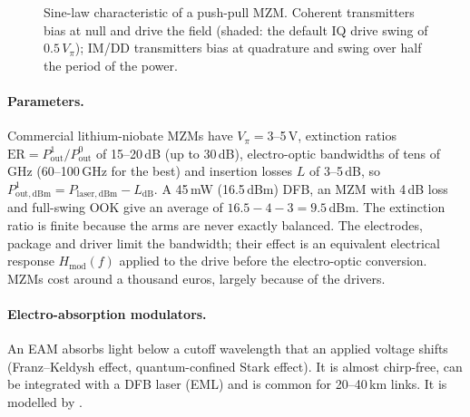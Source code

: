 \begin{figure}[htbp]
\centering
{}
\caption{Sine-law characteristic of a push-pull MZM. Coherent transmitters bias at null and
drive the field (shaded: the default IQ drive swing of $0.5\,V_\pi$); IM/DD transmitters bias at
quadrature and swing over half the period of the power.}
\label{fig:mzm}
\end{figure}

\paragraph{Parameters.} Commercial lithium-niobate MZMs have $V_\pi=3$--5\,V, extinction ratios
$\mathrm{ER}=P_{\mathrm{out}}^1/P_{\mathrm{out}}^0$ of 15--20\,dB (up to 30\,dB), electro-optic bandwidths of tens of GHz (60--100\,GHz
for the best) and insertion losses $L$ of 3--5\,dB, so $P_{\mathrm{out,dBm}}^1=P_{\mathrm{laser,dBm}}-L_{\mathrm{dB}}$. A 45\,mW
(16.5\,dBm) DFB, an MZM with 4\,dB loss and full-swing OOK give an average of
$16.5-4-3=9.5$\,dBm. The extinction ratio is finite because the arms are never exactly balanced.
The electrodes, package and driver limit the bandwidth; their effect is an equivalent
electrical response $H_{\mathrm{mod}}(f)$ applied to the drive before the electro-optic conversion. MZMs
cost around a thousand euros, largely because of the drivers.

\paragraph{Electro-absorption modulators.} An EAM absorbs light below a cutoff wavelength that an
applied voltage shifts (Franz--Keldysh effect, quantum-confined Stark effect). It is almost
chirp-free, can be integrated with a DFB laser (EML) and is common for 20--40\,km links. It is
modelled by .

